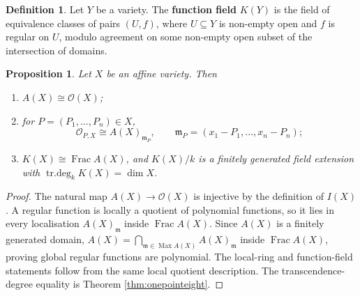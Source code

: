 \documentclass[12pt]{article}
\theoremstyle{plain}
\newtheorem{proposition}[thm]{Proposition}
\theoremstyle{definition}
\newtheorem{defn}[thm]{Definition} %
\begin{document}
\begin{defn}
Let $Y$ be a variety. The \textbf{function field} $K(Y)$ is the field of equivalence classes of pairs $(U,f)$, where $U\subseteq Y$ is non-empty open and $f$ is regular on $U$, modulo agreement on some non-empty open subset of the intersection of domains.
\end{defn}

\begin{proposition}\label{prop:affine_basics}
Let $X$ be an affine variety. Then
\begin{enumerate}
\item $A(X)\cong\mathcal O(X)$;
\item for $P=(P_1,\ldots,P_n)\in X$,
\[
\mathcal O_{P,X}\cong A(X)_{\mathfrak m_P},\qquad \mathfrak m_P=(x_1-P_1,\ldots,x_n-P_n);
\]
\item $K(X)\cong\operatorname{Frac} A(X)$, and $K(X)/k$ is a finitely generated field extension with $\operatorname{tr.deg}_kK(X)=\dim X$.
\end{enumerate}
\end{proposition}
\begin{proof}
The natural map $A(X)\to\mathcal O(X)$ is injective by the definition of $I(X)$. A regular function is locally a quotient of polynomial functions, so it lies in every localisation $A(X)_{\mathfrak m}$ inside $\operatorname{Frac} A(X)$. Since $A(X)$ is a finitely generated domain, $A(X)=\bigcap_{\mathfrak m\in\operatorname{Max}A(X)}A(X)_{\mathfrak m}$ inside $\operatorname{Frac} A(X)$, proving global regular functions are polynomial. The local-ring and function-field statements follow from the same local quotient description. The transcendence-degree equality is Theorem \ref{thm:onepointeight}.
\end{proof}
\end{document}
